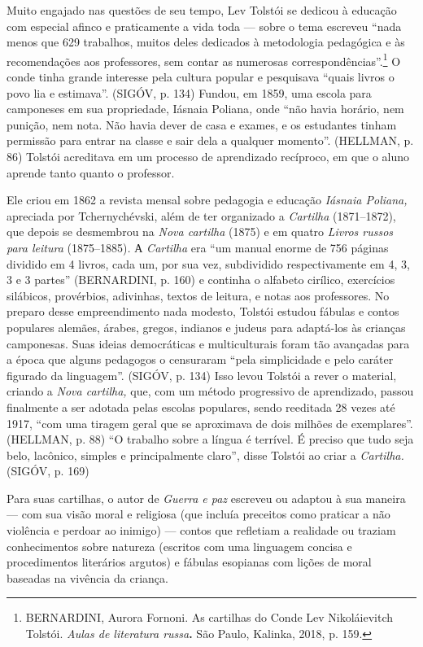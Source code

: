Muito engajado nas questões de seu tempo, Lev Tolstói se dedicou à
educação com especial afinco e praticamente a vida toda --- sobre o tema
escreveu ``nada menos que 629 trabalhos, muitos deles dedicados à
metodologia pedagógica e às recomendações aos professores, sem contar as
numerosas correspondências''.\footnote{BERNARDINI, Aurora Fornoni. As
  cartilhas do Conde Lev Nikoláievitch Tolstói. \emph{Aulas de
  literatura russa}\textbf{.} São Paulo, Kalinka, 2018, p. 159.} O conde
tinha grande interesse pela cultura popular e pesquisava ``quais livros
o povo lia e estimava''. (SIGÓV, p. 134) Fundou, em 1859, uma escola
para camponeses em sua propriedade, Iásnaia Poliana\emph{,} onde ``não
havia horário, nem punição, nem nota. Não havia dever de casa e exames,
e os estudantes tinham permissão para entrar na classe e sair dela a
qualquer momento''. (HELLMAN, p. 86) Tolstói acreditava em um processo
de aprendizado recíproco, em que o aluno aprende tanto quanto o
professor.

Ele criou em 1862 a revista mensal sobre pedagogia e educação
\emph{Iásnaia Poliana,} apreciada por Tchernychévski, além de ter
organizado a \emph{Cartilha} (1871--1872), que depois se desmembrou na
\emph{Nova cartilha} (1875) e em quatro \emph{Livros russos para
leitura} (1875--1885)\emph{.} А \emph{Cartilha} era ``um manual enorme
de 756 páginas dividido em 4 livros, cada um, por sua vez, subdividido
respectivamente em 4, 3, 3 e 3 partes'' (BERNARDINI, p. 160) e continha
o alfabeto cirílico, exercícios silábicos, provérbios, adivinhas, textos
de leitura, e notas aos professores. No preparo desse empreendimento
nada modesto, Tolstói estudou fábulas e contos populares alemães,
árabes, gregos, indianos e judeus para adaptá-los às crianças
camponesas. Suas ideias democráticas e multiculturais foram tão
avançadas para a época que alguns pedagogos o censuraram ``pela
simplicidade e pelo caráter figurado da linguagem''. (SIGÓV, p. 134)
Isso levou Tolstói a rever o material, criando a \emph{Nova cartilha,}
que, com um método progressivo de aprendizado, passou finalmente a ser
adotada pelas escolas populares, sendo reeditada 28 vezes até 1917,
``com uma tiragem geral que se aproximava de dois milhões de
exemplares''. (HELLMAN, p. 88) ``O trabalho sobre a língua é terrível. É
preciso que tudo seja belo, lacônico, simples e principalmente claro'',
disse Tolstói ao criar a \emph{Cartilha.} (SIGÓV, p. 169)

Para suas cartilhas, o autor de \emph{Guerra e paz} escreveu ou adaptou
à sua maneira --- com sua visão moral e religiosa (que incluía preceitos
como praticar a não violência e perdoar ao inimigo) --- contos que
refletiam a realidade ou traziam conhecimentos sobre natureza (escritos
com uma linguagem concisa e procedimentos literários argutos) e fábulas
esopianas com lições de moral baseadas na vivência da criança.

